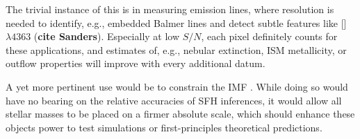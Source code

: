 \documentclass[a4paper,fleqn,usenatbib]{mnras}
\newcommand{\bfr}{\bf\color{red}}
\begin{document}



The trivial instance of this is in measuring emission lines, where resolution is needed to 
identify, e.g., embedded Balmer lines and detect subtle features like [] 
$\lambda4363$ ({\bfr cite Sanders}). Especially at low $S/N$, each pixel definitely counts
for these applications, and estimates of, e.g., nebular extinction, ISM metallicity, or outflow
properties will improve with every additional datum.

A yet more pertinent use would be to constrain the IMF \citep{Conroy12}. While doing so 
would have no bearing on the relative accuracies of SFH inferences, it would allow all stellar 
masses to be placed on a firmer absolute scale, which should enhance these objects power to test 
simulations or first-principles theoretical predictions. %
\fi

%

\end{document}
